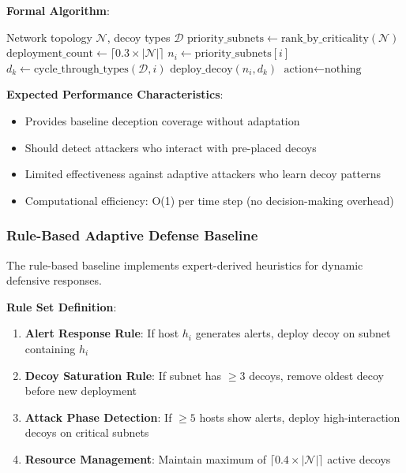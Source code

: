 \documentclass[12pt,oneside]{article}
\begin{document}
\textbf{Formal Algorithm}:
\begin{algorithm}[H]
\caption{Static Decoy Placement Baseline}
\label{alg:static_baseline}
\begin{algorithmic}[1]
\REQUIRE Network topology $\mathcal{N}$, decoy types $\mathcal{D}$
\STATE $\text{priority\_subnets} \leftarrow \text{rank\_by\_criticality}(\mathcal{N})$
\STATE $\text{deployment\_count} \leftarrow \lceil 0.3 \times |\mathcal{N}| \rceil$
    \STATE $n_i \leftarrow \text{priority\_subnets}[i]$
    \STATE $d_k \leftarrow \text{cycle\_through\_types}(\mathcal{D}, i)$
    \STATE $\text{deploy\_decoy}(n_i, d_k)$
\ENDFOR
{}
    \STATE $\text{action} \leftarrow \text{nothing}$ 
\ENDWHILE
\end{algorithmic}
\end{algorithm}

\textbf{Expected Performance Characteristics}:
\begin{itemize}
    \item Provides baseline deception coverage without adaptation
    \item Should detect attackers who interact with pre-placed decoys
    \item Limited effectiveness against adaptive attackers who learn decoy patterns
    \item Computational efficiency: O(1) per time step (no decision-making overhead)
\end{itemize}

\subsubsection{Rule-Based Adaptive Defense Baseline}

The rule-based baseline implements expert-derived heuristics for dynamic defensive responses.

\textbf{Rule Set Definition}:
\begin{enumerate}
    \item \textbf{Alert Response Rule}: If host $h_i$ generates alerts, deploy decoy on subnet containing $h_i$
    \item \textbf{Decoy Saturation Rule}: If subnet has $\geq 3$ decoys, remove oldest decoy before new deployment
    \item \textbf{Attack Phase Detection}: If $\geq 5$ hosts show alerts, deploy high-interaction decoys on critical subnets
    \item \textbf{Resource Management}: Maintain maximum of $\lceil 0.4 \times |\mathcal{N}| \rceil$ active decoys
\end{enumerate}
\end{document}
